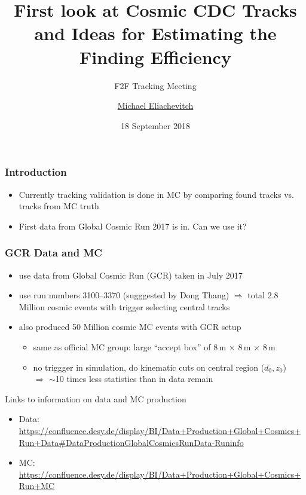\documentclass[18pt]{beamer}
\title{First look at Cosmic CDC Tracks and Ideas for Estimating the Finding Efficiency}
\subtitle{F2F Tracking Meeting}
\author{\underline{Michael Eliachevitch}}
\date{18 September 2018}
\institute{ETP - KIT}
\begin{document}

  \begin{frame}
  \titlepage
  \end{frame}

  \begin{frame}
    \frametitle{Introduction}
    \begin{itemize}
    \item Currently tracking validation is done in MC by comparing found tracks vs. tracks from MC truth
    \item First data from Global Cosmic Run 2017 is in. Can we use it? 
    \end{itemize}
  \end{frame}

  \begin{frame}
    \frametitle{GCR Data and MC}
    \begin{itemize}
    \item use data from Global Cosmic Run (GCR) taken in July 2017
    \item use run numbers 3100--3370 (sugggested by Dong Thang)
      $\Rightarrow$ total 2.8 Million cosmic events with trigger selecting central tracks\\
    \item also produced 50 Million cosmic MC events with GCR setup
      \begin{itemize}
      \item same as official MC group: large ``accept box'' of 8\,m $\times$ 8\,m $\times$ 8\,m 
      \item no triggger in simulation, do kinematic cuts on central region ($d_0, z_0$)\\
        $\Rightarrow$  $\sim$10 times less statistics than in data remain
      \end{itemize}
    \end{itemize}

    \begin{block}{Links to information on data and MC production}
      \begin{itemize}
      \item Data: \footnotesize{\url{https://confluence.desy.de/display/BI/Data+Production+Global+Cosmics+Run+Data\#DataProductionGlobalCosmicsRunData-Runinfo}}
      \item MC: \footnotesize{\url{https://confluence.desy.de/display/BI/Data+Production+Global+Cosmics+Run+MC}}
      \end{itemize}
    \end{block}
  \end{frame}
\end{document}
